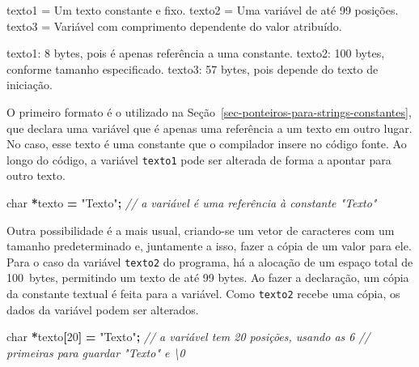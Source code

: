\documentclass[
  11pt,
  a4paper,
]{scrbook}
\newenvironment{Shaded}{\begin{snugshade}}{\end{snugshade}}
\newcommand{\CommentTok}[1]{\textcolor[rgb]{0.56,0.35,0.01}{\textit{#1}}}
\newcommand{\DataTypeTok}[1]{\textcolor[rgb]{0.13,0.29,0.53}{#1}}
\newcommand{\DecValTok}[1]{\textcolor[rgb]{0.00,0.00,0.81}{#1}}
\newcommand{\NormalTok}[1]{#1}
\newcommand{\OperatorTok}[1]{\textcolor[rgb]{0.81,0.36,0.00}{\textbf{#1}}}
\newcommand{\StringTok}[1]{\textcolor[rgb]{0.31,0.60,0.02}{#1}}
\begin{document}
\begin{Shaded}
\begin{Highlighting}[]
\NormalTok{texto1 = \textquotesingle{}Um texto constante e fixo\textquotesingle{}.}
\NormalTok{texto2 = \textquotesingle{}Uma variável de até 99 posições\textquotesingle{}.}
\NormalTok{texto3 = \textquotesingle{}Variável com comprimento dependente do valor atribuído\textquotesingle{}.}

\NormalTok{texto1: 8 bytes, pois é apenas referência a uma constante.}
\NormalTok{texto2: 100 bytes, conforme tamanho especificado.}
\NormalTok{texto3: 57 bytes, pois depende do texto de iniciação.}
\end{Highlighting}
\end{Shaded}

O primeiro formato é o utilizado na
Seção~\ref{sec-ponteiros-para-strings-constantes}, que declara uma
variável que é apenas uma referência a um texto em outro lugar. No caso,
esse texto é uma constante que o compilador insere no código fonte. Ao
longo do código, a variável \texttt{texto1} pode ser alterada de forma a
apontar para outro texto.

\begin{Shaded}
\begin{Highlighting}[]
\DataTypeTok{char} \OperatorTok{*}\NormalTok{texto }\OperatorTok{=} \StringTok{"Texto"}\OperatorTok{;}  \CommentTok{// a variável é uma referência à constante "Texto"}
\end{Highlighting}
\end{Shaded}

Outra possibilidade é a mais usual, criando-se um vetor de caracteres
com um tamanho predeterminado e, juntamente a isso, fazer a cópia de um
valor para ele. Para o caso da variável \texttt{texto2} do programa, há
a alocação de um espaço total de 100~bytes, permitindo um texto de até
99 bytes. Ao fazer a declaração, um cópia da constante textual é feita
para a variável. Como \texttt{texto2} recebe uma cópia, os dados da
variável podem ser alterados.

\begin{Shaded}
\begin{Highlighting}[]
\DataTypeTok{char} \OperatorTok{*}\NormalTok{texto}\OperatorTok{[}\DecValTok{20}\OperatorTok{]} \OperatorTok{=} \StringTok{"Texto"}\OperatorTok{;}  \CommentTok{// a variável tem 20 posições, usando as 6}
                            \CommentTok{// primeiras para guardar "Texto" e \textbackslash{}0}
\end{Highlighting}
\end{Shaded}
\end{document}
